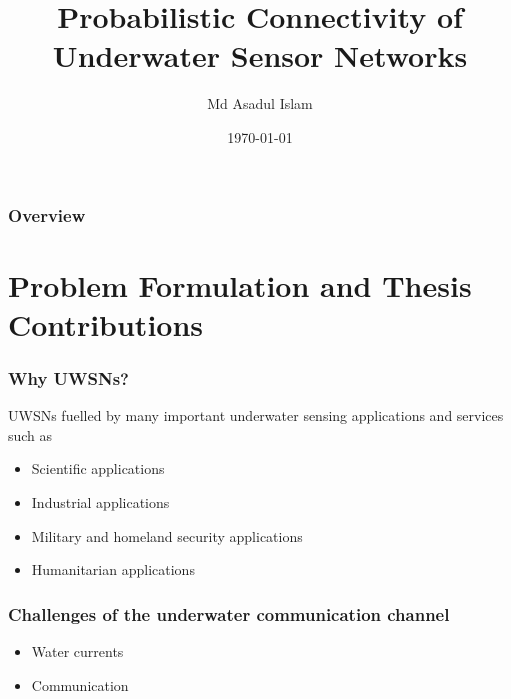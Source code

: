 \documentclass{beamer}
\title[Prob. Conn of USN]{Probabilistic Connectivity of Underwater Sensor Networks} %
\author{Md Asadul Islam} %
\institute[UofA] %
{
University of Alberta \\ %
\medskip
\textit{mdasadul@ualberta.ca} %
}
\date{\today} %
\begin{document}
\begin{frame}
\titlepage %
\end{frame}

\begin{frame}
\frametitle{Overview} %
\tableofcontents %
\end{frame}

\section{Problem Formulation and Thesis Contributions}


\begin{frame}
\frametitle{Why UWSNs?}
UWSNs fuelled by many important underwater sensing applications and services such as

\begin{itemize}
\item Scientific applications
\item Industrial applications
\item Military and homeland security applications
\item Humanitarian applications
\end{itemize}
\end{frame}

\begin{frame}

\frametitle{Challenges of the underwater communication channel}
\begin{itemize}

\item Water currents
\item Communication

\end{itemize}
\end{frame}
\end{document}
